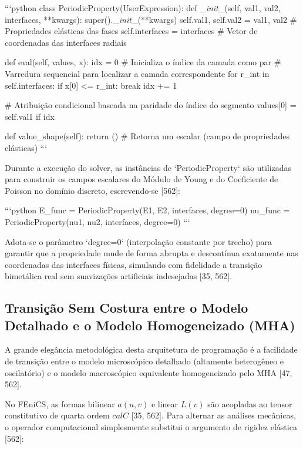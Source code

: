 {```python
class PeriodicProperty(UserExpression):
    def _\textit{init}_(self, val1, val2, interfaces, **kwargs):
        super()._\textit{init}_(**kwargs)
        self.val1, self.val2 = val1, val2 # Propriedades elásticas das fases
        self.interfaces = interfaces      # Vetor de coordenadas das interfaces radiais

    def eval(self, values, x):
        idx = 0                           # Inicializa o índice da camada como par
        # Varredura sequencial para localizar a camada correspondente
        for r_int in self.interfaces:
            if x[0] <= r_int:
                break
            idx += 1

        # Atribuição condicional baseada na paridade do índice do segmento
        values[0] = self.val1 if idx %

    def value_shape(self):
        return () # Retorna um escalar (campo de propriedades elásticas)
```

Durante a execução do solver, as instâncias de `PeriodicProperty` são utilizadas para construir os campos escalares do Módulo de Young e do Coeficiente de Poisson no domínio discreto, escrevendo-se [562]:

```python
E_func = PeriodicProperty(E1, E2, interfaces, degree=0)
nu_func = PeriodicProperty(nu1, nu2, interfaces, degree=0)
```

Adota-se o parâmetro `degree=0` (interpolação constante por trecho) para garantir que a propriedade mude de forma abrupta e descontínua exatamente nas coordenadas das interfaces físicas, simulando com fidelidade a transição bimetálica real sem suavizações artificiais indesejadas [35, 562].

\subsection{Transição Sem Costura entre o Modelo Detalhado e o Modelo Homogeneizado (MHA)}

A grande elegância metodológica desta arquitetura de programação é a facilidade de transição entre o modelo microscópico detalhado (altamente heterogêneo e oscilatório) e o modelo macroscópico equivalente homogeneizado pelo MHA [47, 562].

No FEniCS, as formas bilinear $a(u,v)$ e linear $L(v)$ são acopladas ao tensor constitutivo de quarta ordem $cal{C}$ [35, 562]. Para alternar as análises mecânicas, o operador computacional simplesmente substitui o argumento de rigidez elástica [562]:

}
